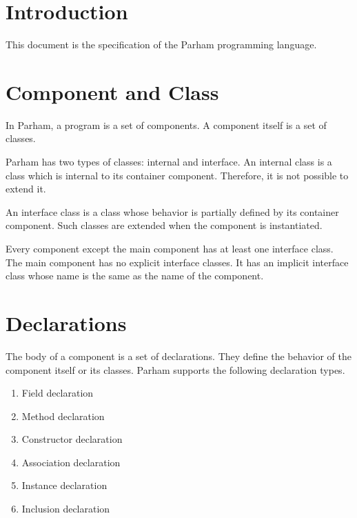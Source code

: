 \documentclass[acmsmall]{acmart}
\begin{document}


\maketitle

\section{Introduction}
This document is the specification of the Parham programming language.

\section{Component and Class}
In Parham, a program is a set of components.
A component itself is a set of classes.

Parham has two types of classes: internal and interface.
An internal class is a class which is internal to its container component.
Therefore, it is not possible to extend it.

An interface class is a class whose behavior is partially defined by its container component.
Such classes are extended when the component is instantiated.

Every component except the main component has at least one interface class.
The main component has no explicit interface classes.
It has an implicit interface class whose name is the same as the name of the component.

\section{Declarations}

The body of a component is a set of declarations.
They define the behavior of the component itself or its classes.
Parham supports the following declaration types.
\begin{enumerate}
\item Field declaration
\item Method declaration
\item Constructor declaration
\item Association declaration
\item Instance declaration
\item Inclusion declaration
\end{enumerate}
\end{document}
